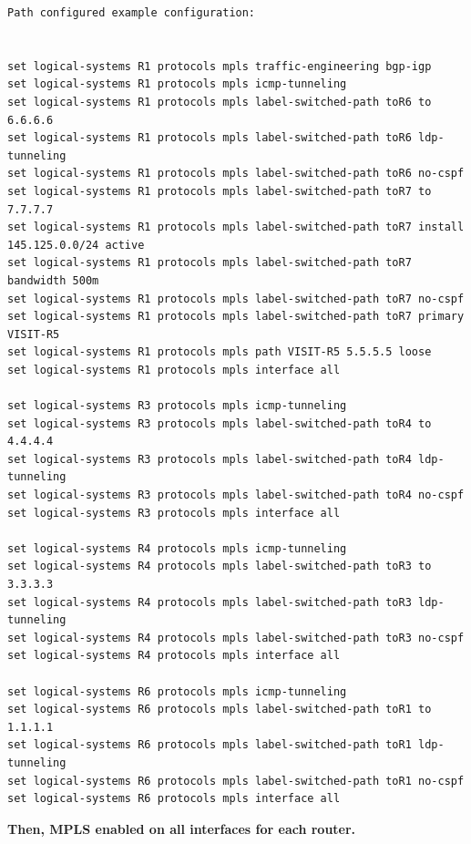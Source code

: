 \documentclass[a4paper]{article}
\begin{document}
\begin{verbatim}
Path configured example configuration:


set logical-systems R1 protocols mpls traffic-engineering bgp-igp
set logical-systems R1 protocols mpls icmp-tunneling
set logical-systems R1 protocols mpls label-switched-path toR6 to 6.6.6.6
set logical-systems R1 protocols mpls label-switched-path toR6 ldp-tunneling
set logical-systems R1 protocols mpls label-switched-path toR6 no-cspf
set logical-systems R1 protocols mpls label-switched-path toR7 to 7.7.7.7
set logical-systems R1 protocols mpls label-switched-path toR7 install 145.125.0.0/24 active
set logical-systems R1 protocols mpls label-switched-path toR7 bandwidth 500m
set logical-systems R1 protocols mpls label-switched-path toR7 no-cspf
set logical-systems R1 protocols mpls label-switched-path toR7 primary VISIT-R5
set logical-systems R1 protocols mpls path VISIT-R5 5.5.5.5 loose
set logical-systems R1 protocols mpls interface all

set logical-systems R3 protocols mpls icmp-tunneling
set logical-systems R3 protocols mpls label-switched-path toR4 to 4.4.4.4
set logical-systems R3 protocols mpls label-switched-path toR4 ldp-tunneling
set logical-systems R3 protocols mpls label-switched-path toR4 no-cspf
set logical-systems R3 protocols mpls interface all

set logical-systems R4 protocols mpls icmp-tunneling
set logical-systems R4 protocols mpls label-switched-path toR3 to 3.3.3.3
set logical-systems R4 protocols mpls label-switched-path toR3 ldp-tunneling
set logical-systems R4 protocols mpls label-switched-path toR3 no-cspf
set logical-systems R4 protocols mpls interface all

set logical-systems R6 protocols mpls icmp-tunneling
set logical-systems R6 protocols mpls label-switched-path toR1 to 1.1.1.1
set logical-systems R6 protocols mpls label-switched-path toR1 ldp-tunneling
set logical-systems R6 protocols mpls label-switched-path toR1 no-cspf
set logical-systems R6 protocols mpls interface all

\end{verbatim}


\textbf{Then, MPLS enabled on all interfaces for each router.}
\end{document}
